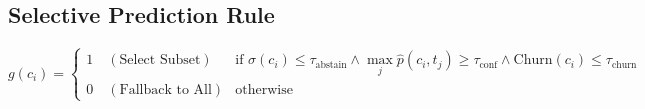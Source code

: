 \subsection{Selective Prediction Rule}
\begin{equation}
    g(c_i) = \begin{cases}
        1 \quad (\text{Select Subset}) & \text{if } \sigma(c_i) \le \tau_{\text{abstain}} \land \max_j \hat{p}(c_i, t_j) \ge \tau_{\text{conf}} \land \text{Churn}(c_i) \le \tau_{\text{churn}} \\
        0 \quad (\text{Fallback to All}) & \text{otherwise}
    \end{cases}
\end{equation}
